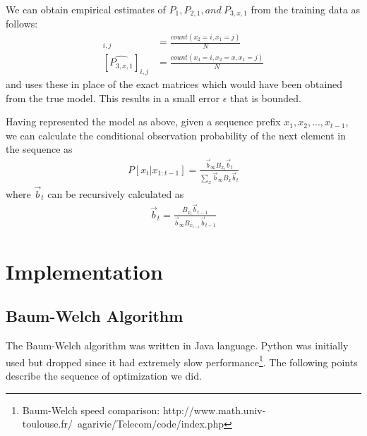 \documentclass[letterpaper]{article}
\begin{document}
We can obtain empirical estimates of $P_{1}, P_{2,1}, and \ P_{3,x,1}$  from the training data as follows:
\begin{align*}
[\hat{P_{2,1}}]_{i,j} & = \frac{count(x_{2} = i, x_{1} = j)}{N} \\
[\hat{P_{3,x,1}}]_{i,j} & = \frac{count(x_{3} = i, x_{2} = x, x_{1} = j)}{ N}
\end{align*}
and uses these in place of the exact matrices which would have been obtained from the true model. This results in a small error $\epsilon$ that is bounded.

Having represented the model as above, given a sequence prefix $x_{1}, x_{2}, ..., x_{t-1}$, we can calculate the conditional observation probability of the next element in the sequence as 
\begin{align*}
P[x_t | x_{1:t-1}] =  \frac{\vec b_{\infty}B_{x_{t}} \vec b_{t}}{\sum_{x} \vec b_{\infty}B_{x} \vec b_{t}}
\end{align*}
where $\vec b_{t}$ can be recursively calculated as
\begin{align*}
\vec b_{t} = \frac{B_{x_{t}}\vec b_{t-1}}{\vec b_{\infty}B_{x_{t-1}} \vec b_{t-1}}
\end{align*}
\section{Implementation}
\subsection{Baum-Welch Algorithm}
The Baum-Welch algorithm was written in Java language. Python was initially used but dropped since it had extremely slow performance\footnote{Baum-Welch speed comparison: http://www.math.univ-toulouse.fr/~agarivie/Telecom/code/index.php}. The following points describe the sequence of optimization we did.
\end{document}
